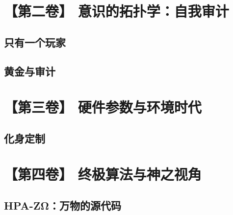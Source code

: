 \documentclass[11pt,a4paper,twoside]{book}
\begin{document}
\part{【第二卷】 意识的拓扑学：自我审计}

\chapter{只有一个玩家}





\chapter{黄金与审计}





\part{【第三卷】 硬件参数与环境时代}

\chapter{化身定制}




\part{【第四卷】 终极算法与神之视角}

\chapter{HPA-ZΩ：万物的源代码}




\end{document}

